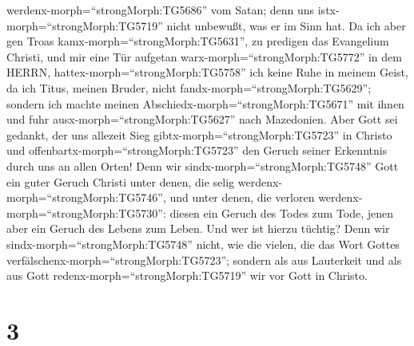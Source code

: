 werdenx-morph=``strongMorph:TG5686'' vom Satan; denn uns
istx-morph=``strongMorph:TG5719'' nicht unbewußt, was er im Sinn hat.
 Da ich aber gen Troas kamx-morph=``strongMorph:TG5631'',
zu predigen das Evangelium Christi, und mir eine Tür aufgetan
warx-morph=``strongMorph:TG5772'' in dem HERRN, 
hattex-morph=``strongMorph:TG5758'' ich keine Ruhe in meinem Geist, da
ich Titus, meinen Bruder, nicht fandx-morph=``strongMorph:TG5629'';
sondern ich machte meinen Abschiedx-morph=``strongMorph:TG5671'' mit
ihnen und fuhr ausx-morph=``strongMorph:TG5627'' nach Mazedonien.
 Aber Gott sei gedankt, der uns allezeit Sieg
gibtx-morph=``strongMorph:TG5723'' in Christo und
offenbartx-morph=``strongMorph:TG5723'' den Geruch seiner Erkenntnis
durch uns an allen Orten!  Denn wir
sindx-morph=``strongMorph:TG5748'' Gott ein guter Geruch Christi unter
denen, die selig werdenx-morph=``strongMorph:TG5746'', und unter denen,
die verloren werdenx-morph=``strongMorph:TG5730'':  diesen
ein Geruch des Todes zum Tode, jenen aber ein Geruch des Lebens zum
Leben. Und wer ist hierzu tüchtig?  Denn wir
sindx-morph=``strongMorph:TG5748'' nicht, wie die vielen, die das Wort
Gottes verfälschenx-morph=``strongMorph:TG5723''; sondern als aus
Lauterkeit und als aus Gott redenx-morph=``strongMorph:TG5719'' wir vor
Gott in Christo.

\hypertarget{section-2}{%
\section{3}\label{section-2}}


